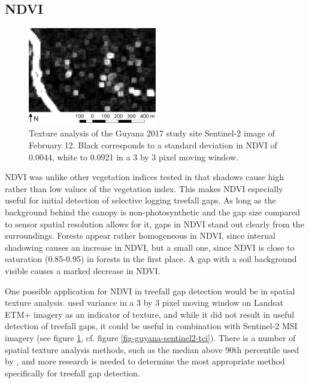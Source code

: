 \documentclass[a4paper,12pt]{scrbook}
\begin{document}
\subsection{NDVI}

\begin{figure}
  \centering
  \includegraphics[width=0.5\textwidth]{thesis-figures/16-guyana17-ndvi-texture}
  \caption{Texture analysis of the Guyana 2017 study site Sentinel-2 image of February 12. Black corresponds to a standard deviation in \ac{NDVI} of 0.0044, white to 0.0921 in a 3 by 3 pixel moving window.}
  \label{fig-ndvi-texture}
\end{figure}

\ac{NDVI} was unlike other vegetation indices tested in that shadows cause high rather than low values of the vegetation index. This makes \ac{NDVI} especially useful for initial detection of selective logging treefall gaps. As long as the background behind the canopy is non-photosynthetic and the gap size compared to sensor spatial resolution allows for it, gaps in \ac{NDVI} stand out clearly from the surroundings. Forests appear rather homogeneous in \ac{NDVI}, since internal shadowing causes an increase in \ac{NDVI}, but a small one, since \ac{NDVI} is close to saturation (0.85-0.95) in forests in the first place. A gap with a soil background visible causes a marked decrease in \ac{NDVI}.

One possible application for \ac{NDVI} in treefall gap detection would be in spatial texture analysis. \citet{asner_remote_2002} used variance in a 3 by 3 pixel moving window on Landsat \ac{ETM+} imagery as an indicator of texture, and while it did not result in useful detection of treefall gaps, it could be useful in combination with Sentinel-2 \ac{MSI} imagery (see figure \ref{fig-ndvi-texture}, cf. figure \ref{fig-guyana-sentinel2-tci}). There is a number of spatial texture analysis methods, such as the median above 90th percentile used by \citet{hamunyela_using_2016}, and more research is needed to determine the most appropriate method specifically for treefall gap detection.
\end{document}

